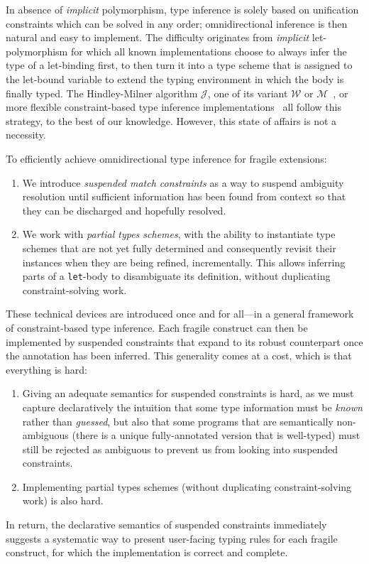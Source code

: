 \documentclass[acmsmall,screen,nonacm,review]{acmart}
\begin{document}
In absence of \emph{implicit} polymorphism, type inference is solely based
on unification constraints which can be solved in any order;
omnidirectional inference is then natural and easy to implement.  The
difficulty originates from \ML \emph{implicit} let-polymorphism for which all known
implementations choose to always infer the type of a let-binding
first, to then turn it into a type scheme that is assigned to the
let-bound variable to extend the typing environment in which the body
is finally typed. The Hindley-Milner algorithm $\mathcal{J}$, one of
its variant $\mathcal{W}$ or $\mathcal{M}$~\cite
{Lee_Yi/algoM@toplas1998}, or more flexible constraint-based type
inference implementations~\citep* {Remy/mleth,Remy/thesis,
Odersky-Sulzmann-Wehr@tpos, Pottier-Remy/emlti} all follow this strategy, to
the best of our knowledge. However, this state of affairs is not a
necessity.

To efficiently achieve omnidirectional type inference for fragile \ML
extensions:
\begin{enumerate}

\item
  We introduce \emph{suspended match constraints} as a way to suspend
  ambiguity resolution until sufficient information has been found from
  context so that they can be discharged and hopefully resolved.

\item
  We work with \emph{partial types schemes}, \ie with the ability to
  instantiate type
  schemes that are not yet fully determined and consequently revisit their
  instances when they are being refined, incrementally. This allows
  inferring parts of a \texttt{let}-body to disambiguate its definition,
  without duplicating constraint-solving work.

\end{enumerate}

These technical devices are introduced once and for all---in a general
framework of constraint-based type inference. Each fragile \ML construct can
then be implemented by suspended constraints that expand to its robust
counterpart once the annotation has been inferred. This generality comes at
a cost, which is that everything is hard:
\begin{enumerate}

\item
  Giving an adequate semantics for suspended constraints is hard, as we
  must capture declaratively the intuition that some type information must be
  \emph{known} rather than \emph{guessed}, but also that some programs
  that are semantically non-ambiguous (there is a unique fully-annotated
  version that is well-typed) must still be rejected as ambiguous to prevent
  us from looking into suspended constraints.

\item
  Implementing partial types schemes (without duplicating constraint-solving
  work) is also hard.

\end{enumerate}
In return, the declarative semantics of suspended constraints
immediately suggests a systematic way to present user-facing typing rules
for each fragile construct, for which the implementation is correct and
complete.
\end{document}
